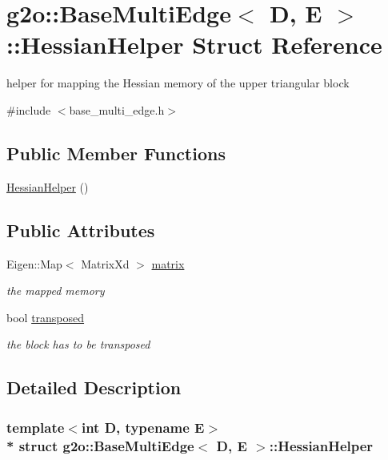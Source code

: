 \hypertarget{structg2o_1_1BaseMultiEdge_1_1HessianHelper}{}\section{g2o\+:\+:Base\+Multi\+Edge$<$ D, E $>$\+:\+:Hessian\+Helper Struct Reference}
\label{structg2o_1_1BaseMultiEdge_1_1HessianHelper}


helper for mapping the Hessian memory of the upper triangular block  




{\ttfamily \#include $<$base\+\_\+multi\+\_\+edge.\+h$>$}

\subsection*{Public Member Functions}
\begin{DoxyCompactItemize}
\item 
\hyperlink{structg2o_1_1BaseMultiEdge_1_1HessianHelper_a5a76a58b21ca39ea6ca1e274b588fad0}{Hessian\+Helper} ()
\end{DoxyCompactItemize}
\subsection*{Public Attributes}
\begin{DoxyCompactItemize}
\item 
Eigen\+::\+Map$<$ Matrix\+Xd $>$ \hyperlink{structg2o_1_1BaseMultiEdge_1_1HessianHelper_ab9eab8a9c5bf6e7814173d1955d7a01c}{matrix}
\begin{DoxyCompactList}\small\item\em the mapped memory \end{DoxyCompactList}\item 
bool \hyperlink{structg2o_1_1BaseMultiEdge_1_1HessianHelper_aeaff0227a982c30364d97ef9f0d9d60c}{transposed}
\begin{DoxyCompactList}\small\item\em the block has to be transposed \end{DoxyCompactList}\end{DoxyCompactItemize}


\subsection{Detailed Description}
\subsubsection*{template$<$int D, typename E$>$\\*
struct g2o\+::\+Base\+Multi\+Edge$<$ D, E $>$\+::\+Hessian\+Helper}

